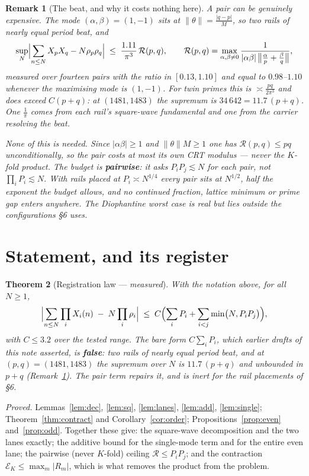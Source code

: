 \documentclass[11pt]{article}
\newtheorem{theorem}{Theorem}
\newtheorem{remark}[theorem]{Remark}
\begin{document}
\begin{remark}[The beat, and why it costs nothing here]\label{rem:beat}
A pair can be genuinely expensive.  The mode $(\alpha,\beta)=(1,-1)$ sits at
$\|\theta\|=\frac{|q-p|}{M}$, so two rails of nearly equal period \emph{beat}, and
\[
\sup_{N}\Bigl|\sum_{n\le N}X_pX_q-N\rho_p\rho_q\Bigr|
\;\le\;\frac{1.11}{\pi^3}\,\mathcal R(p,q),
\qquad
\mathcal R(p,q)=\max_{\alpha,\beta\ne0}\frac{1}{|\alpha\beta|\,\bigl\|\frac\alpha p+\frac\beta q\bigr\|},
\]
measured over fourteen pairs with the ratio in $[0.13,1.10]$ and equal to
$0.98$--$1.10$ whenever the maximising mode is $(1,-1)$.  For twin primes this is
$\asymp\frac{pq}{2\pi^3}$ and does exceed $C(p+q)$: at $(1481,1483)$ the supremum is
$34\,642=11.7\,(p+q)$.  One $\frac1\pi$ comes from each rail's square-wave
fundamental and one from the carrier resolving the beat.

None of this is needed.  Since $|\alpha\beta|\ge1$ and $\|\theta\|M\ge1$ one has
$\mathcal R(p,q)\le pq$ \emph{unconditionally}, so the pair costs at most its own CRT
modulus --- never the $K$-fold product.  The budget is \textbf{pairwise}: it asks
$P_iP_j\lesssim N$ for each pair, not $\prod_iP_i\lesssim N$.  With rails placed at
$P_i\asymp N^{1/4}$ every pair sits at $N^{1/2}$, half the exponent the budget allows,
and no continued fraction, lattice minimum or prime gap enters anywhere.  The
Diophantine worst case is real but lies outside the configurations \S6 uses.
\end{remark}

\section{Statement, and its register}

\begin{theorem}[Registration law --- \emph{measured}]\label{thm:add}
With the notation above, for all $N\ge1$,
\[
\Bigl|\sum_{n\le N}\prod_iX_i(n)\;-\;N\prod_i\rho_i\Bigr|
\;\le\;C\Bigl(\sum_{i}P_i+\sum_{i<j}\min\bigl(N,P_iP_j\bigr)\Bigr),
\]
with $C\le3.2$ over the tested range.  The bare form $C\sum_iP_i$, which earlier drafts
of this note asserted, is \textbf{false}: two rails of nearly equal period beat, and at
$(p,q)=(1481,1483)$ the supremum over $N$ is $11.7\,(p+q)$ and unbounded in $p+q$
(Remark~\ref{rem:beat}).  The pair term repairs it, and is inert for the rail
placements of \S6.
\end{theorem}

\emph{Proved.}  Lemmas~\ref{lem:dec}, \ref{lem:sq}, \ref{lem:lanes}, \ref{lem:add},
\ref{lem:single}; Theorem~\ref{thm:contract} and Corollary~\ref{cor:order};
Propositions~\ref{prop:even} and~\ref{prop:odd}.  Together these give: the square-wave
decomposition and the two lanes exactly; the additive bound for the single-mode term
and for the entire even lane; the pairwise (never $K$-fold) ceiling $\mathcal R\le P_iP_j$;
and the contraction $\mathcal E_K\le\max_m|R_m|$, which is what removes the product from
the problem.
\end{document}
